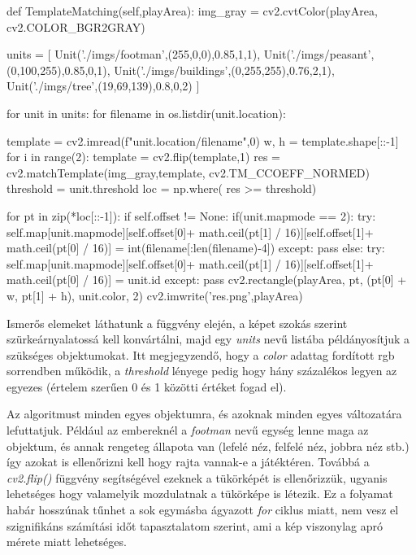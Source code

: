 \begin{python}
def TemplateMatching(self,playArea):
    img_gray = cv2.cvtColor(playArea, cv2.COLOR_BGR2GRAY)

    units = [
            Unit('./imgs/footman',(255,0,0),0.85,1,1),
            Unit('./imgs/peasant',(0,100,255),0.85,0,1),
            Unit('./imgs/buildings',(0,255,255),0.76,2,1),
            Unit('./imgs/tree',(19,69,139),0.8,0,2)
            ]

    for unit in units:
        for filename in os.listdir(unit.location):
            
            template = cv2.imread(f"{unit.location}/{filename}",0)
            w, h = template.shape[::-1]
            for i in range(2):
                template = cv2.flip(template,1)
                res = cv2.matchTemplate(img_gray,template,
                                    cv2.TM_CCOEFF_NORMED)
                threshold = unit.threshold
                loc = np.where( res >= threshold)

                for pt in zip(*loc[::-1]):
                    if self.offset != None:
                        if(unit.mapmode == 2):
                            try:
                                self.map[unit.mapmode][self.offset[0]+
                                math.ceil(pt[1] / 16)][self.offset[1]+
                                math.ceil(pt[0] / 16)] = 
                                int(filename[:len(filename)-4])
                            except:
                                pass
                        else:
                            try:
                                self.map[unit.mapmode][self.offset[0]+
                                math.ceil(pt[1] / 16)][self.offset[1]+
                                math.ceil(pt[0] / 16)] = unit.id
                            except:
                                pass
                    cv2.rectangle(playArea, pt, (pt[0] + w, pt[1] + h),
                                  unit.color, 2)
                    cv2.imwrite('res.png',playArea)
\end{python}

Ismerős elemeket láthatunk a függvény elején, a képet szokás szerint szürkeárnyalatossá kell konvártálni, majd egy \textit{units} nevű listába példányosítjuk a szükséges objektumokat. Itt megjegyzendő, hogy a \textit{color} adattag fordított rgb sorrendben működik, a \textit{threshold} lényege pedig hogy hány százalékos legyen az egyezes (értelem szerűen 0 és 1 közötti értéket fogad el).

Az algoritmust minden egyes objektumra, és azoknak minden egyes változatára lefuttatjuk. Például az embereknél a \textit{footman} nevű egység lenne maga az objektum, és annak rengeteg állapota van (lefelé néz, felfelé néz, jobbra néz stb.) így azokat is ellenőrizni kell hogy rajta vannak-e a játéktéren. Továbbá a \textit{cv2.flip()} függvény
segítségével ezeknek a tükörképét is ellenőrizzük, ugyanis lehetséges hogy valamelyik mozdulatnak a tükörképe is létezik. Ez a folyamat habár hosszúnak tűnhet a sok egymásba ágyazott \textit{for} ciklus miatt, nem vesz el szignifikáns számítási időt tapasztalatom szerint, ami a kép viszonylag apró mérete miatt lehetséges. 

